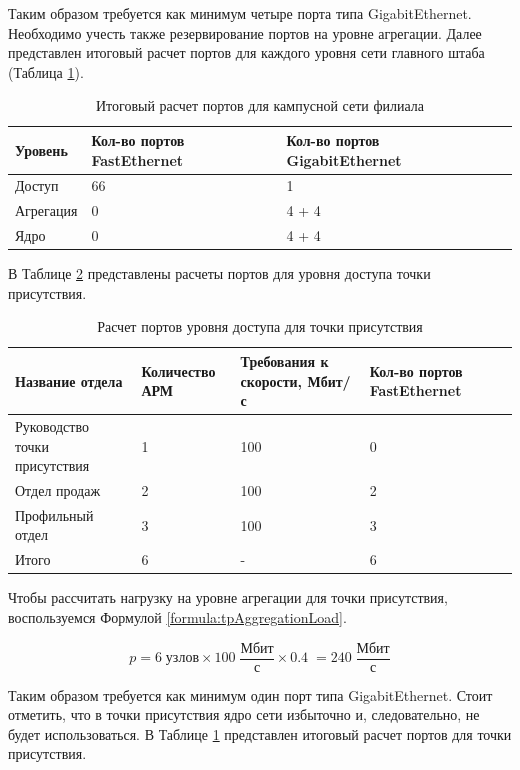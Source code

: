 \documentclass[14pt, a4paper]{extarticle}
\numberwithin{equation}{section}
\begin{document}
Таким образом требуется как минимум четыре порта типа GigabitEthernet.
Необходимо учесть также резервирование портов на уровне агрегации.
Далее представлен итоговый расчет портов для каждого уровня сети
главного штаба (Таблица \ref{table:filialCampusNet}). 

\begin{table}[H]
\centering
\small
\caption{Итоговый расчет портов для кампусной сети филиала}
\label{table:filialCampusNet}
\begin{tabular}{|m{2cm}|m{4cm}|m{3cm}|m{3.5cm}|}
\hline
\textbf{Уровень} & \textbf{Кол-во портов FastEthernet} & \textbf{Кол-во портов GigabitEthernet} \\
\hline
Доступ & 66 & 1 \\
\hline
Агрегация & 0 & 4 + 4 \\
\hline
Ядро & 0 & 4 + 4 \\
\hline
\end{tabular}
\end{table}

В Таблице \ref{table:tpAccessLevel} представлены расчеты портов для уровня доступа 
точки присутствия.

\begin{table}[H]
\centering
\small
\caption{Расчет портов уровня доступа для точки присутствия}
\label{table:tpAccessLevel}
\begin{tabular}{|m{4cm}|m{2.5cm}|m{2.5cm}|m{2.5cm}|m{3cm}|}
\hline
\textbf{Название отдела} & \textbf{Количество АРМ} & \textbf{Требования к скорости, Мбит/с} & \textbf{Кол-во портов FastEthernet} \\
\hline
Руководство точки присутствия & 1 & 100 & 0 \\
\hline
Отдел продаж & 2 & 100 & 2 \\
\hline
Профильный отдел & 3 & 100 & 3 \\
\hline
Итого & 6 & - & 6 \\
\hline
\end{tabular}
\end{table}

Чтобы рассчитать нагрузку на уровне агрегации для 
точки присутствия, воспользуемся Формулой \ref{formula:tpAggregationLoad}.

\begin{equation}
p = 6 \; \text{узлов} \times 100\;\frac{\text{Мбит}}{\text{с}} \times 0.4 \; = 240 \;\frac{\text{Мбит}}{\text{с}}
\label{formula:tpAggregationLoad}
\end{equation}


Таким образом требуется как минимум один порт типа GigabitEthernet.
Стоит отметить, что в точки присутствия ядро сети избыточно и, 
следовательно, не будет использоваться.
В Таблице \ref{table:filialCampusNet} представлен итоговый расчет портов для точки присутствия.
\end{document}
